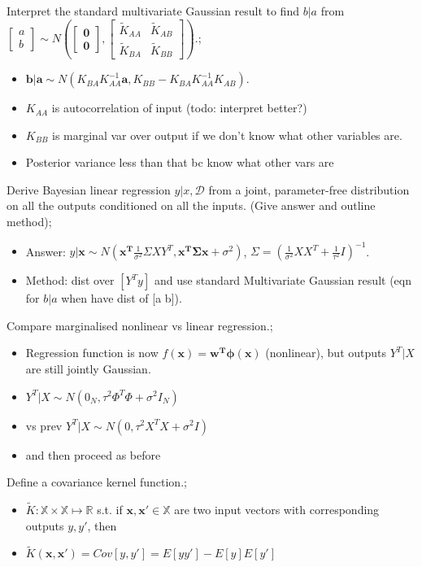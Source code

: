 \documentclass{article}
\begin{document}
Interpret the standard multivariate Gaussian result to find $b|a$ from $\begin{bmatrix} a \\ b \end{bmatrix} \sim N(\begin{bmatrix}\mathbf{0} \\ \mathbf{0} \end{bmatrix}, \begin{bmatrix}\tilde{K}_{AA} & \tilde{K}_{AB} \\ \tilde{K}_{BA} & \tilde{K}_{BB} \end{bmatrix})$.; \begin{itemize} \item $\mathbf{b|a}\sim N(K_{BA}K_{AA}^{-1}\mathbf{a}, K_{BB}-K_{BA}K_{AA}^{-1}K_{AB})$.  \item $K_{AA}$ is autocorrelation of input (todo: interpret better?) \item $K_{BB}$ is marginal var over output if we don't know what other variables are.  \item Posterior variance less than that bc know what other vars are \end{itemize} 

Derive Bayesian linear regression $y|x, \mathcal{D}$ from a joint, parameter-free distribution on all the outputs conditioned on all the inputs. (Give answer and outline method); \begin{itemize} \item Answer: $y|\mathbf{x} \sim N(\mathbf{x^T}\frac{1}{\sigma^2}\Sigma XY^T, \mathbf{x^T\Sigma x}+\sigma^2)$, $\Sigma=(\frac{1}{\sigma^2}XX^T+\frac{1}{\tau^2}I)^{-1}$.  \item Method: dist over $[Y^T y]$ and use standard Multivariate Gaussian result (eqn for $b|a$ when have dist of [a b]).  \end{itemize} 

Compare marginalised nonlinear vs linear regression.; \begin{itemize} \item Regression function is now $f(\mathbf{x})=\mathbf{w^T\phi(x)}$ (nonlinear), but outputs $Y^T|X$ are still jointly Gaussian.  \item $Y^T|X\sim N(0_N, \tau^2\Phi^T\Phi+\sigma^2I_N)$ \item vs prev $Y^T|X\sim N(0, \tau^2X^TX+\sigma^2I)$ \item and then proceed as before \end{itemize}

Define a covariance kernel function.; \begin{itemize} \item $\tilde{K}:\mathbb{X}\times \mathbb{X}\mapsto \mathbb{R}$ s.t. if $\mathbf{x, x'} \in \mathbb{X}$ are two input vectors with corresponding outputs $y, y'$, then \item $\tilde{K}(\mathbf{x, x'})=Cov[y, y']=E[yy']-E[y]E[y']$ \end{itemize} 
\end{document}
